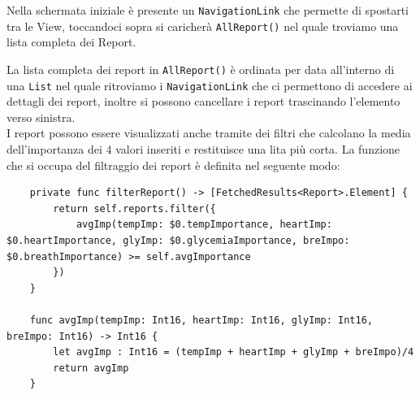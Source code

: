\documentclass{article}
\begin{document}
Nella schermata iniziale è presente un \texttt{NavigationLink} che permette di spostarti tra le View, toccandoci sopra si caricherà \texttt{AllReport()} nel quale troviamo una lista completa dei Report.

\smallskip

La lista completa dei report in \texttt{AllReport()} è ordinata per data all'interno di una \texttt{List} nel quale ritroviamo i \texttt{NavigationLink} che ci permettono di accedere ai dettagli dei report, inoltre si possono cancellare i report trascinando l'elemento verso sinistra. \\
I report possono essere visualizzati anche tramite dei filtri che calcolano la media dell'importanza dei 4 valori inseriti e restituisce una lita più corta. La funzione che si occupa del filtraggio dei report è definita nel seguente modo:

\smallskip
\begin{lstlisting}
    private func filterReport() -> [FetchedResults<Report>.Element] {
        return self.reports.filter({
            avgImp(tempImp: $0.tempImportance, heartImp: $0.heartImportance, glyImp: $0.glycemiaImportance, breImpo: $0.breathImportance) >= self.avgImportance
        })
    }
    
    func avgImp(tempImp: Int16, heartImp: Int16, glyImp: Int16, breImpo: Int16) -> Int16 {
        let avgImp : Int16 = (tempImp + heartImp + glyImp + breImpo)/4
        return avgImp
    }
\end{lstlisting}
\end{document}
